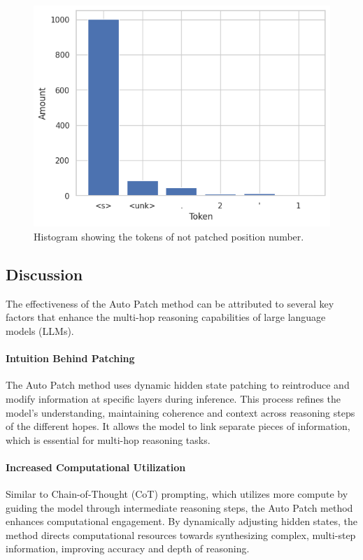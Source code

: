 \documentclass[11pt]{article}
\begin{document}
\begin{figure}[!ht]
    \centering
    \includegraphics[width=\columnwidth]{figures/Histogram showing the tokens of not patched position number.png}
    \caption{Histogram showing the tokens of not patched position number.}
    \vspace{-.5cm}
\end{figure}

\subsection{Discussion}
The effectiveness of the Auto Patch method can be attributed to several key factors that enhance the multi-hop reasoning capabilities of large language models (LLMs).

\paragraph{Intuition Behind Patching} The Auto Patch method uses dynamic hidden state patching to reintroduce and modify information at specific layers during inference. This process refines the model’s understanding, maintaining coherence and context across reasoning steps of the different hopes. It allows the model to link separate pieces of information, which is essential for multi-hop reasoning tasks.

\paragraph{Increased Computational Utilization} Similar to Chain-of-Thought (CoT) prompting, which utilizes more compute by guiding the model through intermediate reasoning steps, the Auto Patch method enhances computational engagement. By dynamically adjusting hidden states, the method directs computational resources towards synthesizing complex, multi-step information, improving accuracy and depth of reasoning.
\end{document}

